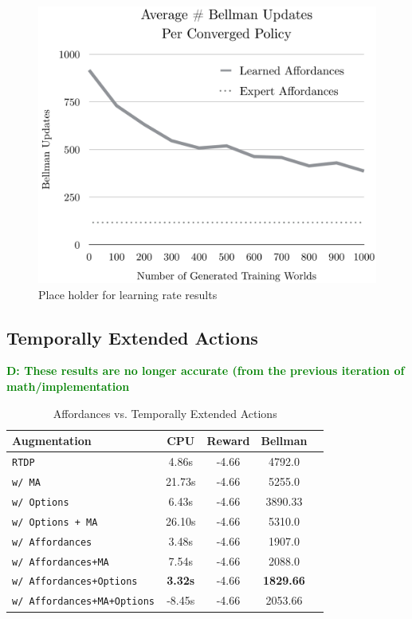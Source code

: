 \documentclass[conference]{IEEEtran}
\newcommand{\dnote}[1]{\textcolor{Green}{\textbf{D: #1}}}
\begin{document}
\begin{figure}[H]
\centering
\includegraphics[scale=0.195]{figures/training_results.png}%
  \caption{Place holder for learning rate results}
  \label{fig:training_results}
\end{figure}

\subsection{Temporally Extended Actions}

\dnote{These results are no longer accurate (from the previous iteration of math/implementation}
\begin{table}[H]
\centering
\begin{tabular}{ l  || c c c c}
  Augmentation 						&	CPU	&	Reward 	& Bellman \\ \hline
  \texttt{RTDP}  						&	4.86s	&	-4.66		&	4792.0		\\
  \texttt{w/ MA}  						&	21.73s	&	-4.66		&	5255.0		\\
  \texttt{w/ Options}  					&	6.43s	&	-4.66		&	3890.33		\\
  \texttt{w/ Options + MA}  				&	26.10s	&	-4.66		&	5310.0		\\
  \texttt{w/ Affordances}  				& 	3.48s	&	-4.66		&	1907.0		\\
  \texttt{w/ Affordances+MA}  			& 	7.54s	&	-4.66		&	2088.0		\\
  \texttt{w/ Affordances+Options}  		& 	{\bf 3.32s}	&	-4.66		&	{\bf 1829.66}		\\
  \texttt{w/ Affordances+MA+Options}  	& 	-8.45s	&	-4.66		&	2053.66		\\
\end{tabular}
\caption{Affordances vs. Temporally Extended Actions}
\label{table:temp_ext_acts_results}
\end{table}
\end{document}
